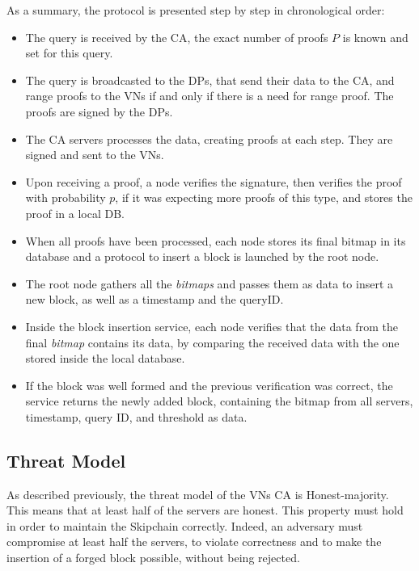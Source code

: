 \documentclass{article}
\begin{document}
As a summary, the protocol is presented step by step in chronological order:
\begin{itemize}
\item{The query is received by the CA, the exact number of proofs $P$ is known and set for this query.}
\item{The query is broadcasted to the DPs, that send their data to the CA, and range proofs to the VNs if and only if there is a need for range proof. The proofs are signed by the DPs.}
\item{The CA servers processes the data, creating proofs at each step. They are signed and sent to the VNs.}
\item{Upon receiving a proof, a node verifies the signature, then verifies the proof with probability $p$, if it was expecting more proofs of this type,  and stores the proof in a local DB.}
\item{When all proofs have been processed, each node stores its final bitmap in its database and a protocol to insert a block is launched by the root node.}
\item{The root node gathers all the \textit{bitmaps} and passes them as data to insert a new block, as well as a timestamp and the queryID.}
\item{Inside the block insertion service, each node verifies that the data from the final \textit{bitmap} contains its data, by comparing the received data with the one stored inside the local database.}
\item{If the block was well formed and the previous verification was correct, the service returns the newly added block, containing the bitmap from all servers, timestamp, query ID, and threshold as data.}
\end{itemize}
\subsection{Threat Model}
As described previously, the threat model of the VNs CA is Honest-majority. This means that at least half of the servers are honest. This property must hold in order to maintain the Skipchain correctly. Indeed, an adversary must compromise at least half the servers, to violate correctness and to make the insertion of a forged block possible, without being rejected.
\end{document}
